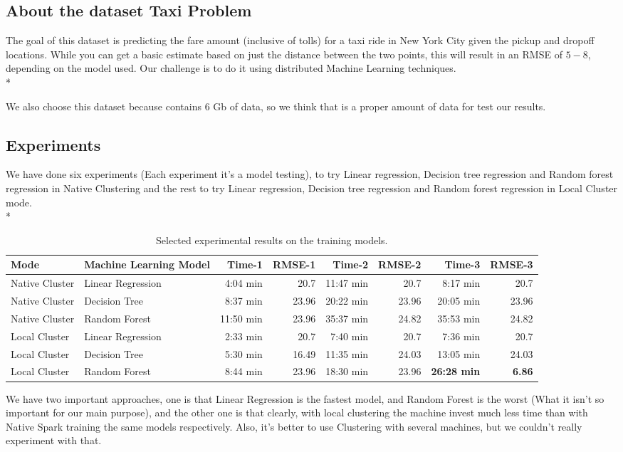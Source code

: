\noindent
\subsection{About the dataset Taxi Problem} \cite{taxiDataset}

The goal of this dataset is predicting the fare amount (inclusive of tolls) for a taxi ride in New York City given the pickup and dropoff locations. While you can get a basic estimate based on just the distance between the two points, this will result in an RMSE of $5-$8, depending on the model used. Our challenge is to do it using distributed Machine Learning techniques.\\*

We also choose this dataset because contains 6 Gb of data, so we think that is a proper amount of data for test our results.

\subsection{Experiments }

We have done six experiments (Each experiment it’s a model testing), to try Linear regression, Decision tree regression and Random forest regression in Native Clustering and the rest to try Linear regression, Decision tree regression and Random forest regression in Local Cluster mode.\\*

\begin{table}[h]
	\centering
	\begin{tabular}{llrrrrrr}
		Mode & Machine Learning Model & Time-1 & RMSE-1 & Time-2 & RMSE-2 & Time-3 & RMSE-3
		\\ \hline \hline
		Native Cluster  & Linear Regression   &    4:04 min  &   20.7  &  11:47 min & 20.7 & 8:17 min & 20.7 \\   
		Native Cluster  & Decision Tree   &    8:37 min  &   23.96  &  20:22 min  &  23.96  & 20:05 min &  23.96\\   
		Native Cluster  & Random Forest   &   11:50 min &   23.96  &  35:37 min  & 24.82  & 35:53 min & 24.82 \\  \hline
		Local Cluster   & Linear Regression   &   2:33 min &   20.7  &  7:40 min  & 20.7 & 7:36 min  & 20.7   \\ 
		Local Cluster   & Decision Tree   &   5:30 min &   16.49  & 11:35 min & 24.03 & 13:05 min & 24.03  \\   
		Local Cluster   & Random Forest   &   8:44 min &   23.96  & 18:30 min & 23.96 & \textbf{26:28 min} & \textbf{6.86}  \\
		\hline \hline
	\end{tabular}
	\caption{Selected experimental results on the training models.}
	\label{tab:results}
\end{table}

We have two important approaches, one is that Linear Regression is the fastest model, and Random Forest is the worst (What it isn’t so important for our main purpose), and the other one is that clearly, with local clustering the machine invest much less time than with Native Spark training the same models respectively.
Also, it’s better to use Clustering with several machines, but we couldn’t really experiment with that.
